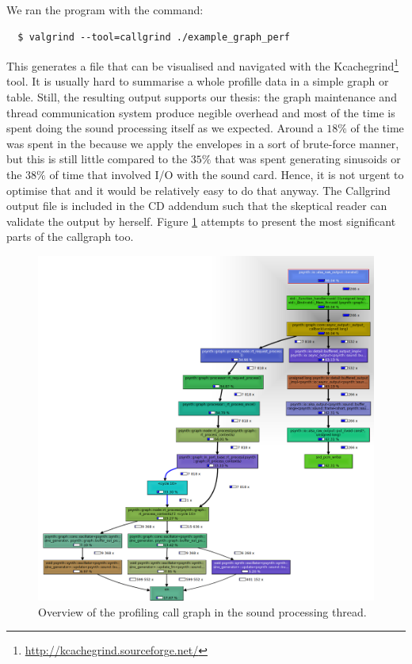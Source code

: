 We ran the program with the command:
\begin{verbatim}
  $ valgrind --tool=callgrind ./example_graph_perf
\end{verbatim}

This generates a  file that can be
visualised and navigated with the 
Kcachegrind\footnote{\url{http://kcachegrind.sourceforge.net/}}
tool. It is usually hard to summarise a whole profille data in a
simple graph or table. Still, the resulting output supports our
thesis: the graph maintenance and thread communication system produce
negible overhead and most of the time is spent doing the sound
processing itself as we expected. Around a $18\%$ of the time was
spent in the  because we apply the envelopes
in a sort of brute-force manner, but this is still little compared to
the $35\%$ that was spent generating sinusoids or the $38\%$ of time
that involved I/O with the sound card. Hence, it is not urgent to
optimise that and it would be relatively easy to do that anyway. The
Callgrind output file is included in the CD addendum such that the
skeptical reader can validate the output by herself. Figure
\ref{fig:callgrind-1} attempts to present the most significant parts
of the callgraph too.

\begin{figure}[h!]
  \centering
  \includegraphics[width=\textwidth]{pic/callgrind1.png}
  \caption{Overview of the profiling call graph in the sound
    processing thread.}
  \label{fig:callgrind-1}
\end{figure}

